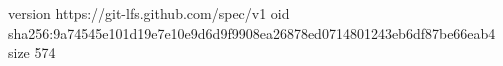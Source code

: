 version https://git-lfs.github.com/spec/v1
oid sha256:9a74545e101d19e7e10e9d6d9f9908ea26878ed0714801243eb6df87be66eab4
size 574
